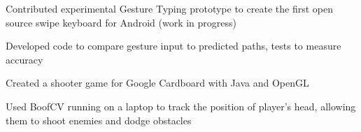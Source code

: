\documentclass[]{deedy-resume-openfont}
\begin{document}
\begin{minipage}[t]{0.67\textwidth}
\begin{tightemize}
\item Contributed experimental Gesture Typing prototype to create the first open source swipe keyboard for Android (work in progress)
\item Developed code to compare gesture input to predicted paths, tests to measure accuracy
\end{tightemize}
\sectionsep

\begin{tightemize}
\item Created a shooter game for Google Cardboard with Java and OpenGL 
\item Used BoofCV running on a laptop to track the position of player’s head, allowing them to shoot enemies and dodge obstacles
\end{tightemize}
\sectionsep

\end{minipage} 
\end{document}
